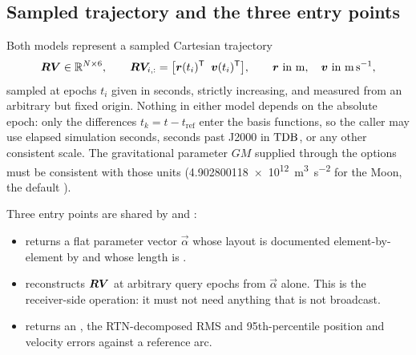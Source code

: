 \subsection{Sampled trajectory and the three entry points}

Both models represent a sampled Cartesian trajectory
\begin{equation}
  \label{eq:eph-state-contract}
  \bm{RV} \in \mathbb{R}^{N\times 6},
  \qquad
  \bm{RV}_{i,:} = \big[\bm{r}(t_i)^{\mathsf{T}} \;\; \bm{v}(t_i)^{\mathsf{T}}\big],
  \qquad
  \bm{r}\ \text{in \si{\meter}},\quad \bm{v}\ \text{in \si{\meter\per\second}},
\end{equation}
sampled at epochs $t_i$ given in seconds, strictly increasing, and measured
from an arbitrary but fixed origin. Nothing in either model depends on the
absolute epoch: only the differences $t_k = t - t_\mathrm{ref}$ enter the
basis functions, so the caller may use elapsed simulation seconds, seconds
past J2000 in $\mathrm{TDB}$, or any other consistent scale. The gravitational
parameter $GM$ supplied through the options must be consistent with those
units (\SI{4.902800118e12}{\meter\cubed\per\second\squared} for the Moon, the
default ).

Three entry points are shared by  and :

\begin{itemize}[leftmargin=1.4em]
  \item {} returns a flat parameter vector $\vec{\alpha}$
    whose layout is documented element-by-element by  and
    whose length is .
  \item {} reconstructs $\bm{RV}$ at arbitrary query
    epochs from $\vec{\alpha}$ alone. This is the receiver-side operation: it
    must not need anything that is not broadcast.
  \item {} returns an
    , the RTN-decomposed RMS and 95th-percentile
    position and velocity errors against a reference arc.
\end{itemize}


